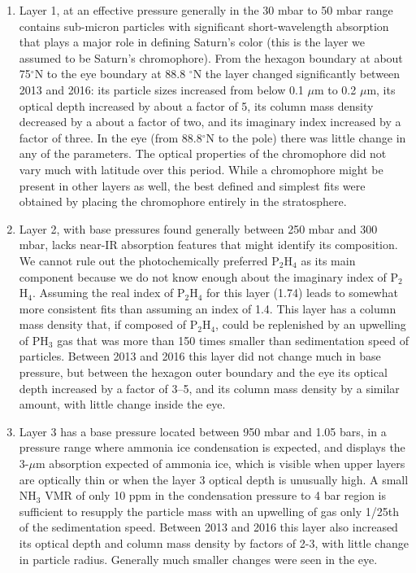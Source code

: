 \documentclass[article,11pt]{emulateapj}
\def\degx{$^\circ$}
\def\mum{$\mu$m }
\def\mumx{$\mu$m}
\def\pht{PH$_3$ }
\def\pthf{P$_2$H$_4$ }
\def\pthfx{P$_2$H$_4$}
\def\nht{NH$_3$ }
\begin{document}
\begin{enumerate}
\setlength{\itemsep}{0pt}
\item Layer 1, at an effective pressure generally in the 30 mbar to 50
  mbar range contains sub-micron particles with significant
  short-wavelength absorption that plays a major role in defining
  Saturn's color (this is the layer we assumed to be Saturn's chromophore). 
 From the hexagon boundary at about 75\degx N to the
  eye boundary at 88.8 \degx N the layer changed significantly between
 2013 and 2016: its particle sizes increased from below
  0.1 \mum to 0.2 \mumx, its optical depth increased by about a
  factor of 5, its column mass density decreased by a about
a factor of two,  and its imaginary index increased by a factor of three.
  In the eye (from 88.8\degx N to the pole) there was little change
in any of the parameters. The optical properties of the chromophore
did not vary much with latitude over this period.
 While a chromophore might be present in other layers as well,
  the best defined and simplest fits were obtained by placing the
  chromophore entirely in the stratosphere.

\item Layer 2, with base pressures found generally between 250 mbar and 300 mbar, lacks
  near-IR absorption features that might identify its composition. We
  cannot rule out the photochemically preferred \pthf as its main
  component because we do not know enough about the imaginary index of
  \pthfx.  Assuming the real index of \pthf for this layer (1.74)
  leads to somewhat more consistent fits than assuming an index of
  1.4. This layer has a column mass density that, if
  composed of \pthfx, could be replenished by an upwelling of \pht gas
  that was more than 150 times smaller than sedimentation
  speed of particles.  Between 2013 and 2016 this layer did not change much in base pressure,
 but between the hexagon outer boundary and the eye
its optical depth increased by a factor of 3--5, and its column mass
density by a similar amount, with little change inside the eye. 

\item Layer 3 has a base pressure located between 950 mbar and 1.05 bars, in a pressure
range where ammonia ice condensation is expected, and displays the
3-\mum absorption expected of ammonia ice, which is visible when upper layers
are optically thin or when the layer 3 optical depth is unusually
high. A small \nht VMR of only 10 ppm in the condensation pressure to
4 bar region is sufficient to resupply the particle
mass with an upwelling of gas only 1/25th of the sedimentation speed. Between
2013 and 2016 this layer also increased its optical depth and column mass
density by factors of 2-3, with little change in particle radius. Generally
much smaller changes were seen in the eye.


\end{enumerate}
\end{document}
